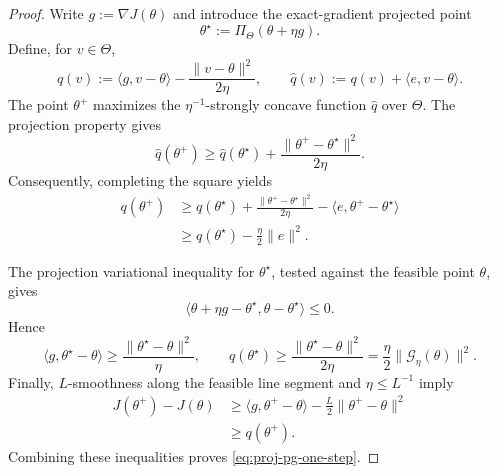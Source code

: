 \documentclass{article}
\theoremstyle{definition}
\theoremstyle{remark}
\theoremstyle{mystyle}
\newcommand{\1}{\mathbbm{1}}
\begin{document}
\begin{proof}
Write $g:=\nabla J(\theta)$ and introduce the exact-gradient
projected point
\[
\theta^\star:=\Pi_\Theta(\theta+\eta g).
\]
Define, for $v\in\Theta$,
\[
q(v):=\langle g,v-\theta\rangle
       -\frac{\|v-\theta\|^2}{2\eta},
\qquad
\widehat q(v):=q(v)+\langle e,v-\theta\rangle.
\]
The point $\theta^+$ maximizes the $\eta^{-1}$-strongly concave
function $\widehat q$ over $\Theta$. The projection property gives
\[
\widehat q(\theta^+)
\ge \widehat q(\theta^\star)
     +\frac{\|\theta^+-\theta^\star\|^2}{2\eta}.
\]
Consequently, completing the square yields
\begin{align*}
q(\theta^+)
&\ge q(\theta^\star)
   +\frac{\|\theta^+-\theta^\star\|^2}{2\eta}
   -\langle e,\theta^+-\theta^\star\rangle\\
&\ge q(\theta^\star)-\frac{\eta}{2}\|e\|^2.
\end{align*}

The projection variational inequality for $\theta^\star$, tested
against the feasible point $\theta$, gives
\[
\langle \theta+\eta g-\theta^\star,
        \theta-\theta^\star\rangle\le0.
\]
Hence
\[
\langle g,\theta^\star-\theta\rangle
\ge\frac{\|\theta^\star-\theta\|^2}{\eta},
\qquad
q(\theta^\star)
\ge\frac{\|\theta^\star-\theta\|^2}{2\eta}
=\frac{\eta}{2}\|\mathcal G_\eta(\theta)\|^2.
\]
Finally, $L$-smoothness along the feasible line segment and
$\eta\le L^{-1}$ imply
\begin{align*}
J(\theta^+)-J(\theta)
&\ge\langle g,\theta^+-\theta\rangle
     -\frac L2\|\theta^+-\theta\|^2\\
&\ge q(\theta^+).
\end{align*}
Combining these inequalities proves
\eqref{eq:proj-pg-one-step}.
\end{proof}
\end{document}
